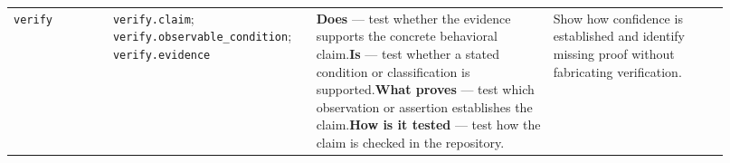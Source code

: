\begin{landscape}
\begin{longtable}{@{}L{0.13\linewidth}L{0.25\linewidth}L{0.31\linewidth}L{0.23\linewidth}@{}}
\texttt{verify} & \texttt{verify.claim}; \texttt{verify.observable\_condition}; \texttt{verify.evidence} & \textbf{Does} --- test whether the evidence supports the concrete behavioral claim.\newline{}\textbf{Is} --- test whether a stated condition or classification is supported.\newline{}\textbf{What proves} --- test which observation or assertion establishes the claim.\newline{}\textbf{How is it tested} --- test how the claim is checked in the repository. & Show how confidence is established and identify missing proof without fabricating verification. \\
\end{longtable}
\endgroup
\end{landscape}
